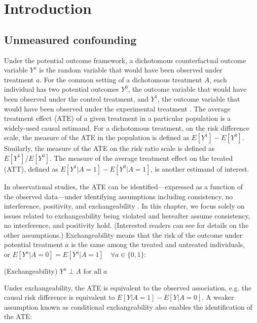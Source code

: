 \section{Introduction}
\label{sec:introduction}

\subsection{Unmeasured confounding}

Under the potential outcome framework, a dichotomous counterfactual outcome variable $Y^a$ is the random variable that would have been observed under treatment $a$. For the common setting of a dichotomous treatment $A$, each individual has two potential outcomes $Y^{0}$, the outcome variable that would have been observed under the control treatment, and $Y^{1}$, the outcome variable that would have been observed under the experimental treatment \cite{hernan2010causal}. The average treatment effect (ATE) of a given treatment in a particular population is a widely-used causal estimand. For a dichotomous treatment, on the risk difference scale, the measure of the ATE in the population is defined as $E[Y^{1}] - E[Y^{0}]$. Similarly, the measure of the ATE on the risk ratio scale is defined as $E[Y^{1}] / E[Y^{0}]$. The measure of the average treatment effect on the treated (ATT), defined as $E[Y^{1}|A=1] - E[Y^{0}|A=1]$, is another estimand of interest.

In observational studies, the ATE can be identified---expressed as a function of the observed data---under identifying assumptions including consistency, no interference, positivity, and exchangeability \cite{naimi2023defining}. In this chapter, we focus solely on issues related to exchangeability being violated and hereafter assume consistency, no interference, and positivity hold. (Interested readers can see \cite{hernan2010causal, naimi2023defining} for details on the other assumptions.) Exchangeability means that the risk of the outcome under potential treatment $a$ is the same among the treated and untreated individuals, or $E[Y^a|A=0] = E[Y^a|A=1] \quad \forall a \in \{0, 1\}$:

\begin{assumption} (Exchangeability) \label{as:exchangeability}
  $Y^a \perp A \text{ for all } a$
\end{assumption}

Under exchangeability, the ATE is equivalent to the observed association,  e.g. the causal risk difference is equivalent to $E[Y | A = 1] - E[Y | A = 0]$. A weaker assumption known as conditional exchangeability also enables the identification of the ATE:

